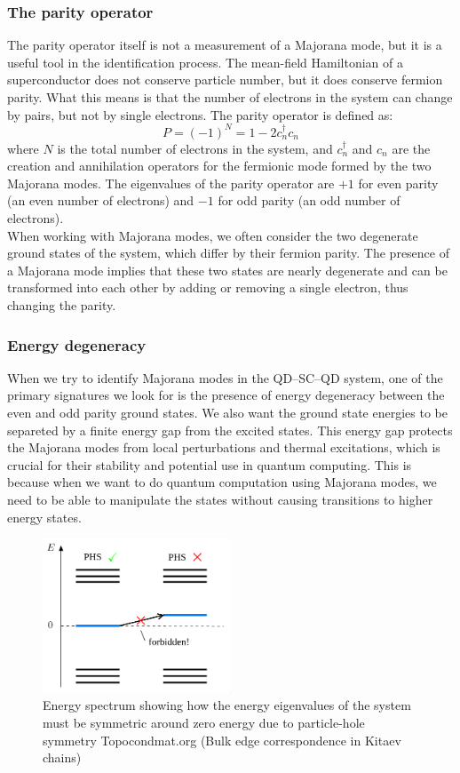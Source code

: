 \documentclass[11pt, letterpaper, titlepage]{article}
\begin{document}
\subsubsection{The parity operator}
The parity operator itself is not a measurement of a Majorana mode, but it is a useful tool in the identification process. The mean-field Hamiltonian of a superconductor does not conserve particle number, but it does conserve fermion parity. What this means is that the number of electrons in the system can change by pairs, but not by single electrons. The parity operator is defined as:
$$
P = (-1)^{N} = 1 - 2c_n ^{†} c_n
$$
where $N$ is the total number of electrons in the system, and $c_n^{†}$ and $c_n$ are the creation and annihilation operators for the fermionic mode formed by the two Majorana modes. The eigenvalues of the parity operator are $+1$ for even parity (an even number of electrons) and $-1$ for odd parity (an odd number of electrons).\\
When working with Majorana modes, we often consider the two degenerate ground states of the system, which differ by their fermion parity. The presence of a Majorana mode implies that these two states are nearly degenerate and can be transformed into each other by adding or removing a single electron, thus changing the parity.\\

\subsubsection{Energy degeneracy}
When we try to identify Majorana modes in the QD–SC–QD system, one of the primary signatures we look for is the presence of energy degeneracy between the even and odd parity ground states. We also want the ground state energies to be separeted by a finite energy gap from the excited states. This energy gap protects the Majorana modes from local perturbations and thermal excitations, which is crucial for their stability and potential use in quantum computing. This is because when we want to do quantum computation using Majorana modes, we need to be able to manipulate the states without causing transitions to higher energy states.\\
\begin{figure}
  \centering
  \includegraphics[width=0.5\textwidth]{../External_Figs/gs_symmetry.png}%
  \caption{Energy spectrum showing how the energy eigenvalues of the system must be symmetric around zero energy due to particle-hole symmetry Topocondmat.org (Bulk edge correspondence in Kitaev chains)}
  \label{fig:gs_symmetry}
\end{figure}
\newpage
\end{document}

